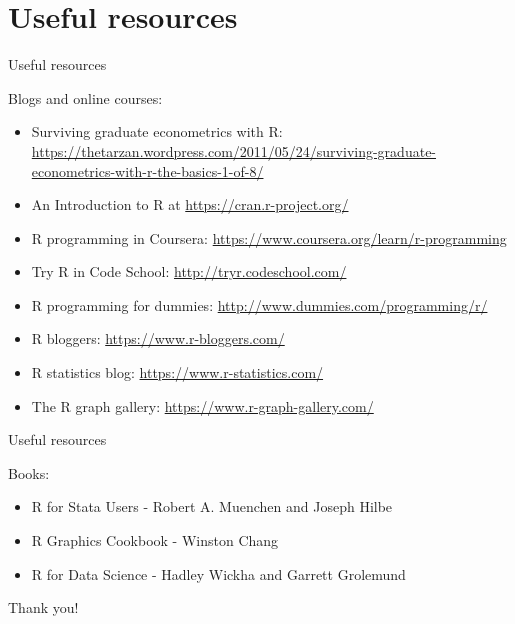 \documentclass[ignorenonframetext,]{beamer}
\begin{document}
\section{Useful resources}\label{useful-resources}

\begin{frame}{Useful resources}

\textcolor{myColor}{Blogs and online courses:}

\begin{itemize}
\item
  Surviving graduate econometrics with R:
  \url{https://thetarzan.wordpress.com/2011/05/24/surviving-graduate-econometrics-with-r-the-basics-1-of-8/}
\item
  An Introduction to R at \url{https://cran.r-project.org/}
\item
  R programming in Coursera:
  \url{https://www.coursera.org/learn/r-programming}
\item
  Try R in Code School: \url{http://tryr.codeschool.com/}
\item
  R programming for dummies: \url{http://www.dummies.com/programming/r/}
\item
  R bloggers: \url{https://www.r-bloggers.com/}
\item
  R statistics blog: \url{https://www.r-statistics.com/}
\item
  The R graph gallery: \url{https://www.r-graph-gallery.com/}
\end{itemize}

\end{frame}

\begin{frame}{Useful resources}

\textcolor{myColor}{Books:}

\begin{itemize}
\item
  R for Stata Users - Robert A. Muenchen and Joseph Hilbe
\item
  R Graphics Cookbook - Winston Chang
\item
  R for Data Science - Hadley Wickha and Garrett Grolemund
\end{itemize}

\end{frame}

\begin{frame}

\huge Thank you!

\end{frame}
\end{document}
